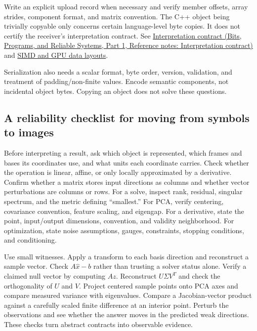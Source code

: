 Write an explicit upload record when necessary and verify member offsets, array strides, component format, and matrix convention. The C++ object being trivially copyable only concerns certain language-level byte copies. It does not certify the receiver's interpretation contract. See \href{../01-Bits-Programs-and-Reliable-Systems-P01/main.pdf\#nameddest=appendix-f414bd4ed05c}{Interpretation contract (Bits, Programs, and Reliable Systems, Part 1, Reference notes: Interpretation contract)} and \hyperref[appendix-3c7b1a56de01]{SIMD and GPU data layouts}.

Serialization also needs a scalar format, byte order, version, validation, and treatment of padding/non-finite values. Encode semantic components, not incidental object bytes. Copying an object does not solve these questions.

\subsection{A reliability checklist for moving from symbols to images}\label{02-foundations-ii-ch037-a-reliability-checklist-for-moving-from-symbols-to-images}

\hypertarget{02-foundations-ii-ch037-a-reliability-checklist-for-moving-from-symbols-to-images}{}

Before interpreting a result, ask which object is represented, which frames and bases its coordinates use, and what units each coordinate carries. Check whether the operation is linear, affine, or only locally approximated by a derivative. Confirm whether a matrix stores input directions as columns and whether vector perturbations are columns or rows. For a solve, inspect rank, residual, singular spectrum, and the metric defining ``smallest.'' For PCA, verify centering, covariance convention, feature scaling, and eigengap. For a derivative, state the point, input/output dimensions, convention, and validity neighborhood. For optimization, state noise assumptions, gauges, constraints, stopping conditions, and conditioning.

Use small witnesses. Apply a transform to each basis direction and reconstruct a sample vector. Check \(A\hat x-b\) rather than trusting a solver status alone. Verify a claimed null vector by computing \(Az\). Reconstruct \(U\Sigma V^T\) and check the orthogonality of \(U\) and \(V\). Project centered sample points onto PCA axes and compare measured variance with eigenvalues. Compare a Jacobian-vector product against a carefully scaled finite difference at an interior point. Perturb the observations and see whether the answer moves in the predicted weak directions. These checks turn abstract contracts into observable evidence.

